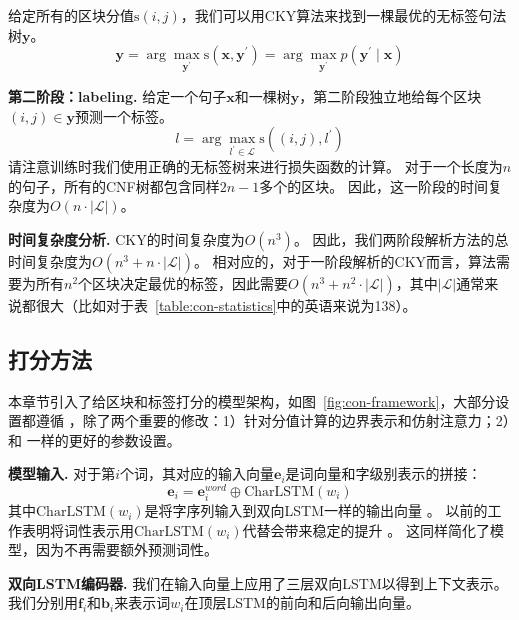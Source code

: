 给定所有的区块分值$\mathrm{s}(i,j)$，我们可以用CKY算法来找到一棵最优的无标签句法树$\boldsymbol{y}$。
\begin{equation} \label{eq:tree-argmax}
	\boldsymbol{y} = \arg\max_{\boldsymbol{y}^{\prime}} \mathrm{s}(\boldsymbol{x}, \boldsymbol{y}^{\prime}) = \arg\max_{\boldsymbol{y}^{\prime}} p(\boldsymbol{y}^{\prime} \mid \boldsymbol{x})
\end{equation}

\noindent\textbf{第二阶段：labeling.}
给定一个句子$\boldsymbol{x}$和一棵树$\boldsymbol{y}$，第二阶段独立地给每个区块$(i,j) \in \boldsymbol{y}$预测一个标签。
\begin{equation} \label{eq:label-argmax}
	l = \arg\max_{l^{\prime} \in \mathcal{L}} \mathrm{s}((i,j),l^{\prime})
\end{equation}
请注意训练时我们使用正确的无标签树来进行损失函数的计算。
对于一个长度为$n$的句子，所有的CNF树都包含同样$2n-1$多个的区块。
因此，这一阶段的时间复杂度为$O(n\cdot|\mathcal{L}|)$。

\noindent\textbf{时间复杂度分析.}
CKY的时间复杂度为$O(n^3)$。
因此，我们两阶段解析方法的总时间复杂度为$O(n^3+n\cdot|\mathcal{L}|)$。
相对应的，对于一阶段解析的CKY而言，算法需要为所有$n^2$个区块决定最优的标签，因此需要$O(n^3+n^2\cdot|\mathcal{L}|)$，其中$|\mathcal{L}|$通常来说都很大（比如对于表~\ref{table:con-statistics}中的英语来说为138）。

\subsection{打分方法}

本章节引入了给区块和标签打分的模型架构，如图~\ref{fig:con-framework}，大部分设置都遵循 \citet{stern-etal-2017-minimal}，除了两个重要的修改：1）针对分值计算的边界表示和仿射注意力；2）和 \citet{dozat-etal-2017-biaffine}一样的更好的参数设置。

\noindent\textbf{模型输入.}
对于第$i$个词，其对应的输入向量$\mathbf{e}_i$是词向量和字级别表示的拼接：
\begin{equation} \label{eq:token-representation}
	\mathbf{e}_i = \mathbf{e}^{word}_i \oplus \mathrm{CharLSTM}(w_i)
\end{equation}
其中$\mathrm{CharLSTM}(w_i)$是将字序列输入到双向LSTM一样的输出向量 \citep{lample-etal-2016-neural}。
以前的工作表明将词性表示用$\mathrm{CharLSTM}(w_i)$代替会带来稳定的提升 \citep{kitaev-klein-2018-constituency}。
这同样简化了模型，因为不再需要额外预测词性。

\noindent\textbf{双向LSTM编码器.}
我们在输入向量上应用了三层双向LSTM以得到上下文表示。
我们分别用$\mathbf{f}_i$和$\mathbf{b}_i$来表示词$w_i$在顶层LSTM的前向和后向输出向量。

